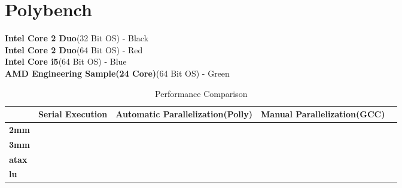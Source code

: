 \label{chap:testing}
\section{Polybench}
\textbf{Intel Core 2 Duo}(32 Bit OS) - Black \\
\textbf{Intel Core 2 Duo}(64 Bit OS) - Red   \\
\textbf{Intel Core i5}(64 Bit OS)    - Blue  \\
\textbf{AMD Engineering Sample(24 Core)}(64 Bit OS) - Green \\

\begin{table}[h]
\begin{center}
{\footnotesize
\begin{tabular}{| l | p{2cm} | p{2cm} | p{2cm} | p{2cm} |}
\hline
                  &\textbf{Serial Execution} & \textbf{Automatic Parallelization(Polly)} & \textbf{Manual Parallelization(GCC)} \\ \hline
\textbf{2mm}      &                          &                                           &                                      \\ \hline
\textbf{3mm}      &                          &                                           &                                      \\ \hline
\textbf{atax}     &                          &                                           &                                      \\ \hline
\textbf{lu}       &                          &                                           &                                      \\
\hline

\end{tabular}
}
\end{center}
\caption{Performance Comparison}
\end{table}

